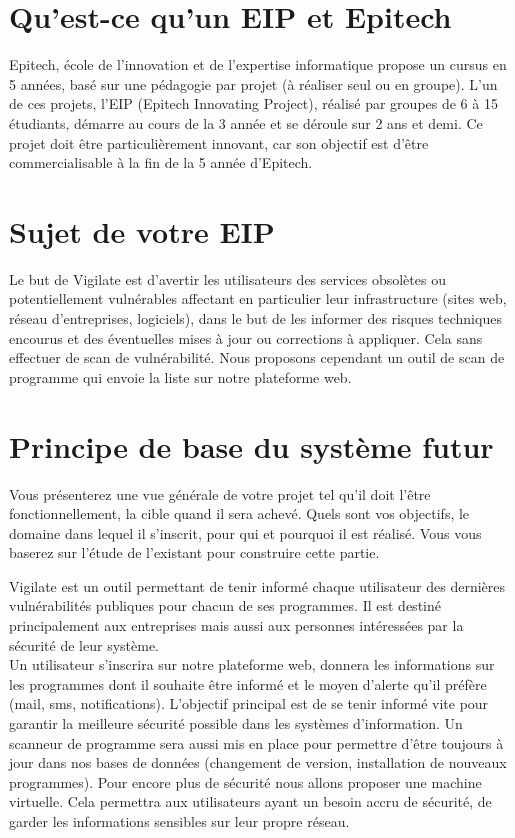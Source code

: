 \section{Qu'est-ce qu’un EIP et Epitech}
Epitech, école de l'innovation et de l'expertise informatique propose un cursus en 5 années, basé sur une pédagogie par projet (à réaliser seul ou en groupe). L'un de ces projets, l’EIP (Epitech Innovating Project), réalisé par groupes de 6 à 15 étudiants, démarre au cours de la 3\ieme{} année et se déroule sur 2 ans et demi. Ce projet doit être particulièrement innovant, car son objectif est d’être commercialisable à la fin de la 5\ieme{} année d’Epitech.

\section{Sujet de votre EIP}
Le but de Vigilate est d’avertir les utilisateurs des services obsolètes ou potentiellement vulnérables affectant en particulier leur infrastructure (sites web, réseau d'entreprises, logiciels), dans le but de les informer des risques techniques encourus et des éventuelles mises à jour ou corrections à appliquer.
Cela sans effectuer de scan de vulnérabilité.
Nous proposons cependant un outil de scan de programme qui envoie la liste sur notre plateforme web.

\section{Principe de base du système futur}
Vous présenterez une vue générale de votre projet tel qu’il doit l’être fonctionnellement, la cible quand il sera achevé. Quels sont vos objectifs, le domaine dans lequel il s’inscrit, pour qui et pourquoi il est réalisé. Vous vous baserez sur l’étude de l’existant pour construire cette partie.

Vigilate est un outil permettant de tenir informé chaque utilisateur des dernières vulnérabilités publiques pour chacun de ses programmes. Il est destiné principalement aux entreprises mais aussi aux personnes intéressées par la sécurité de leur système.\\
Un utilisateur s’inscrira sur notre plateforme web, donnera les informations sur les programmes dont il souhaite être informé et le moyen d’alerte qu’il préfère (mail, sms, notifications). L’objectif principal est de se tenir informé vite pour garantir la meilleure sécurité possible dans les systèmes d’information. Un scanneur de programme sera aussi mis en place pour permettre d’être toujours à jour dans nos bases de données (changement de version, installation de nouveaux programmes). Pour encore plus de sécurité nous allons proposer une machine virtuelle. Cela permettra aux utilisateurs ayant un besoin accru de sécurité, de garder les informations sensibles sur leur propre réseau.

